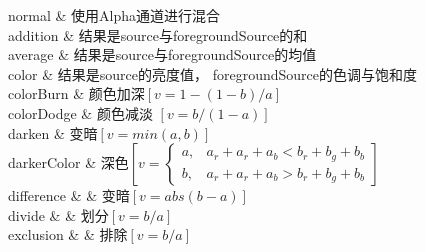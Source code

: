 ﻿




normal
    &
使用Alpha通道进行混合   
    \\

addition
    &
结果是source与foregroundSource的和
    \\

average
    &
结果是source与foregroundSource的均值
    \\

color
    &
结果是source的亮度值，
foregroundSource的色调与饱和度
    \\

colorBurn
    &
颜色加深$\left[v=1-(1-b)/a\right]$
    \\

colorDodge
    &
颜色减淡 $\left[v=b/(1-a)\right]$
    \\

darken
    &
变暗$\left[v=min(a,b)\right]$
    \\

darkerColor
    &
深色$\left[v=\begin{cases}
a, & a_r+a_r+a_b<b_r+b_g+b_b \\ 
b, & a_r+a_r+a_b>b_r+b_g+b_b
\end{cases}\right]$
    \\

difference
    &
    &
变暗$\left[v=abs(b-a)\right]$
    \\

divide
    &
    &
划分$\left[v=b/a\right]$
    \\

exclusion
    &
    &
排除$\left[v=b/a\right]$
    \\













